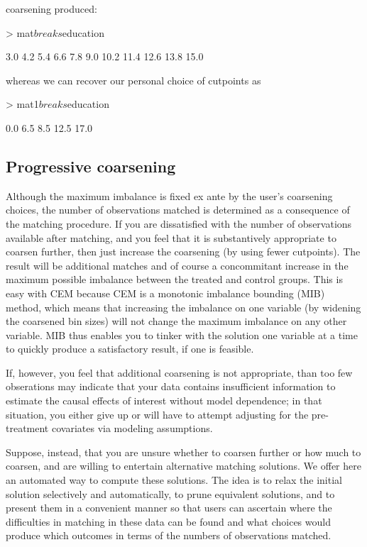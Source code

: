 \documentclass[article]{jss}
\begin{document}
coarsening produced:
\begin{Schunk}
\begin{Sinput}
> mat$breaks$education
\end{Sinput}
\begin{Soutput}
 [1]  3.0  4.2  5.4  6.6  7.8  9.0 10.2 11.4 12.6 13.8 15.0
\end{Soutput}
\end{Schunk}
whereas we can recover our personal choice of cutpoints as
\begin{Schunk}
\begin{Sinput}
> mat1$breaks$education
\end{Sinput}
\begin{Soutput}
[1]  0.0  6.5  8.5 12.5 17.0
\end{Soutput}
\end{Schunk}
\subsection{Progressive coarsening}

Although the maximum imbalance is fixed ex ante by the user's
coarsening choices, the number of observations matched is determined
as a consequence of the matching procedure.  If you are dissatisfied
with the number of observations available after matching, and you feel
that it is substantively appropriate to coarsen further, then just
increase the coarsening (by using fewer cutpoints).  The result will
be additional matches and of course a concommitant increase in the
maximum possible imbalance between the treated and control groups.
This is easy with CEM because CEM is a monotonic imbalance bounding
(MIB) method, which means that increasing the imbalance on one
variable (by widening the coarsened bin sizes) will not change the
maximum imbalance on any other variable.  MIB thus enables you to
tinker with the solution one variable at a time to quickly produce a
satisfactory result, if one is feasible.

If, however, you feel that additional coarsening is not appropriate,
than too few obserations may indicate that your data contains
insufficient information to estimate the causal effects of interest
without model dependence; in that situation, you either give up or
will have to attempt adjusting for the pre-treatment covariates via
modeling assumptions.

Suppose, instead, that you are unsure whether to coarsen further or
how much to coarsen, and are willing to entertain alternative matching
solutions.  We offer here an automated way to compute these solutions.
The idea is to relax the initial  solution selectively and
automatically, to prune equivalent solutions, and to present them in a
convenient manner so that users can ascertain where the difficulties
in matching in these data can be found and what choices would produce
which outcomes in terms of the numbers of observations matched.
\end{document}
